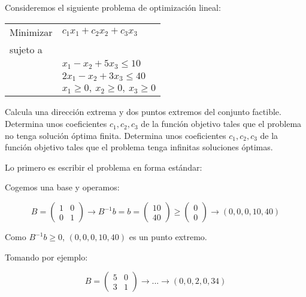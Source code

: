 \begin{problem}[3]
Consideremos el siguiente problema de optimizaci\'on lineal:

\begin{center}
\begin{tabular}{ll}
Minimizar & $c_1x_1+c_2x_2+c_3x_3$ \\
sujeto a & \\
& $x_1 - x_2 + 5x_3\leq 10$\\
& $2x_1 - x_2 + 3x_3 \leq 40$\\
&$x_1\geq 0,\ x_2\geq 0,\ x_3\geq 0$
\end{tabular}
\end{center}


\ppart Calcula una direcci\'on extrema  y dos puntos extremos
  del conjunto factible.
\ppart Determina unos coeficientes $c_1,c_2,c_3$
de la funci\'on objetivo tales que el problema no tenga
soluci\'on \'optima finita.
\ppart Determina unos coeficientes $c_1,c_2,c_3$
de la funci\'on objetivo tales que el problema tenga
infinitas soluciones \'optimas.



\solution

Lo primero es escribir el problema en forma estándar:


\begin{ioprob}
\end{ioprob}

\spart

Cogemos una base y operamos:

\[B = \begin{pmatrix}1&0\\0&1\end{pmatrix} \to B^{-1}b = b = \begin{pmatrix}10\\40\end{pmatrix}\geq \begin{pmatrix}0\\0\end{pmatrix} \to (0,0,0,10,40)\]

Como $B^{-1}b \geq 0$, $(0,0,0,10,40)$ es un punto extremo.

Tomando por ejemplo:

\[B = \begin{pmatrix}5&0\\3&1\end{pmatrix} \to ... \to (0,0,2,0,34)\]


\end{problem}

